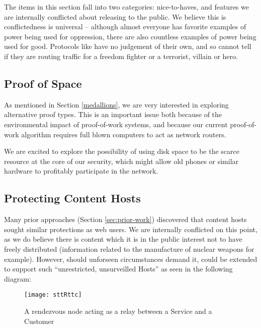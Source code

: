 
The items in this section fall into two categories: nice-to-haves, and features we are internally conflicted about releasing to the public. We believe this is conflictedness is universal -- although almost everyone has favorite examples of power being used for oppression, there are also countless examples of power being used for good. Protocols like \Orchid{} have no judgement of their own, and so cannot tell if they are routing traffic for a freedom fighter or a terrorist, villain or hero.

\subsection{Proof of Space}
\label{future:proof-of-space}

As mentioned in Section \ref{medallions}, we are very interested in
exploring alternative proof types. This is an important issue both
because of the environmental impact of proof-of-work systems, and
because our current proof-of-work algorithm requires full blown
computers to act as network routers.

We are excited to explore the possibility of using disk space to be
the scarce resource at the core of our security, which might allow old
phones or similar hardware to profitably participate in the \Orchid{}
network.

\subsection{Protecting Content Hosts}
\label{subsec:protocol-extentions}

Many prior approaches (Section \ref{sec:prior-work}) discovered that content hosts sought similar protections as web users. We are internally conflicted on this point, as we do believe there is content which it is in the public interest not to have freely distributed (information related to the manufacture of nuclear weapons for example). However, should unforseen circumstances demand it, \Orchid{} could be extended to support such ``unrestricted, unsurveilled Hosts'' as seen in the following diagram:

\begin{figure}[htbp]
  \centering
  \texttt{[image: sttRttc]}
  \caption{A rendezvous node acting as a relay between a Service and a Customer}
\end{figure}

